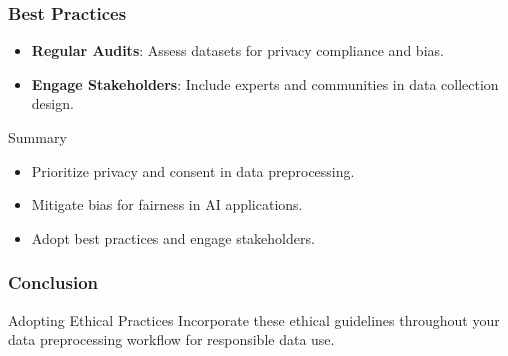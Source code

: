 \documentclass[aspectratio=169]{beamer}
\begin{document}
\begin{frame}[fragile]
    \frametitle{Best Practices}
    \begin{itemize}
        \item \textbf{Regular Audits}: Assess datasets for privacy compliance and bias.
        \item \textbf{Engage Stakeholders}: Include experts and communities in data collection design.
    \end{itemize}
    \begin{block}{Summary}
        \begin{itemize}
            \item Prioritize privacy and consent in data preprocessing.
            \item Mitigate bias for fairness in AI applications.
            \item Adopt best practices and engage stakeholders.
        \end{itemize}
    \end{block}
\end{frame}

\begin{frame}[fragile]
    \frametitle{Conclusion}
    \begin{block}{Adopting Ethical Practices}
        Incorporate these ethical guidelines throughout your data preprocessing workflow for responsible data use. 
    \end{block}
\end{frame}
\end{document}
